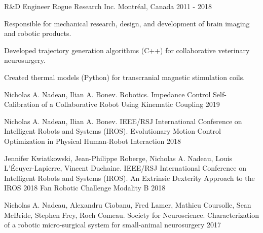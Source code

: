 \documentclass[11pt, letterpaper]{awesome-cv}
\begin{document}
\begin{cventries}
\cventry
{R\&D Engineer}
{Rogue Research Inc.}
{Montréal, Canada}
{2011 - 2018}
{
\begin{cvitems} 
\item{Responsible for mechanical research, design, and development of brain imaging and robotic products.}
\item{Developed trajectory generation algorithms (C++) for collaborative veterinary neurosurgery.}
\item{Created thermal models (Python) for transcranial magnetic stimulation coils.}
\end{cvitems}
}

\end{cventries}


\begin{cventries}
\end{cventries}

\begin{cventries}

\cventry
{Nicholas A. Nadeau, Ilian A. Bonev. Robotics.}
{Impedance Control Self-Calibration of a Collaborative Robot Using Kinematic Coupling }
{}
{2019}
{}

\cventry
{Nicholas A. Nadeau, Ilian A. Bonev. IEEE/RSJ International Conference on Intelligent Robots and Systems (IROS).}
{Evolutionary Motion Control Optimization in Physical Human-Robot Interaction}
{}
{2018}
{}

\cventry
{Jennifer Kwiatkowski, Jean-Philippe Roberge, Nicholas A. Nadeau, Louis L'Écuyer-Lapierre, Vincent Duchaine. IEEE/RSJ International Conference on Intelligent Robots and Systems (IROS).}
{An Extrinsic Dexterity Approach to the IROS 2018 Fan Robotic Challenge Modality B}
{}
{2018}
{}

\cventry
{Nicholas A. Nadeau, Alexandru Ciobanu, Fred Lamer, Mathieu Coursolle, Sean McBride, Stephen Frey, Roch Comeau. Society for Neuroscience.}
{Characterization of a robotic micro-surgical system for small-animal neurosurgery}
{}
{2017}
{}

\end{cventries}
\end{document}
